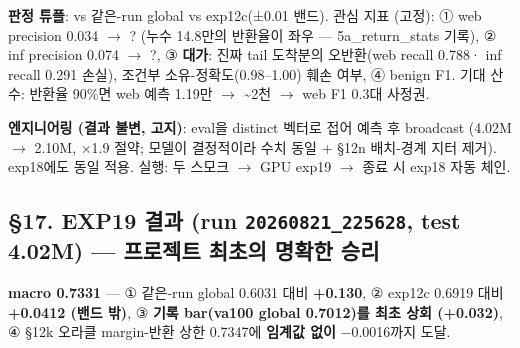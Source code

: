 \textbf{판정 튜플}: vs 같은-run global vs exp12c(±0.01 밴드). 관심 지표 (고정): ① web precision 0.034 \ensuremath{\rightarrow} ? (누수 14.8만의 반환율이 좌우 — 5a\_\allowbreak{}return\_\allowbreak{}stats 기록), ② inf precision 0.074 \ensuremath{\rightarrow} ?, ③ \textbf{대가}: 진짜 tail 도착분의 오반환(web recall 0.788· inf recall 0.291 손실), 조건부 소유-정확도(0.98–1.00) 훼손 여부, ④ benign F1. 기대 산수: 반환율 90\%면 web 예측 1.19만 \ensuremath{\rightarrow} \textasciitilde{}2천  \ensuremath{\rightarrow}  web F1 0.3대 사정권.

\textbf{엔지니어링 (결과 불변, 고지)}: eval을 distinct 벡터로 접어 예측 후 broadcast (4.02M \ensuremath{\rightarrow} 2.10M, ×1.9 절약; 모델이 결정적이라 수치 동일 +\allowbreak{} §12n 배치-경계 지터 제거). exp18에도 동일 적용. 실행: 두 스모크  \ensuremath{\rightarrow}  GPU exp19  \ensuremath{\rightarrow}  종료 시 exp18 자동 체인.

\subsection{§17. EXP19 결과 (run \texttt{20260821\allowbreak{}\_\allowbreak{}\allowbreak{}225628}, test 4.02M) — \textbf{프로젝트 최초의 명확한 승리}}
\textbf{macro 0.7331} — ① 같은-run global 0.6031 대비 \textbf{+\allowbreak{}0.130}, ② exp12c 0.6919 대비 \textbf{+\allowbreak{}0.0412 (밴드 밖)}, ③ \textbf{기록 bar(va100 global 0.7012)를 최초 상회 (+\allowbreak{}0.032)}, ④ §12k 오라클 margin-반환 상한 0.7347에 \textbf{임계값 없이} −0.0016까지 도달.

